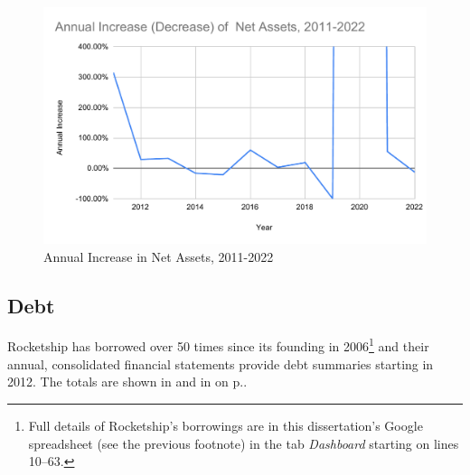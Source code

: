 \begin{figure}[b]
  \centering
  \includegraphics[width=\textwidth,keepaspectratio]{Annual_Increase_Net_Assets_2011-2022}%
  \caption{Annual Increase in Net Assets, 2011-2022}%
  \label{fig:annual_net_asset_increases}
\end{figure}






\subsection{Debt}\indent%
\label{sec:debt}

Rocketship has borrowed over 50 times since its founding in 2006\footnote{Full details of Rocketship's borrowings are in this dissertation's Google spreadsheet (see the previous footnote) in the tab \textit{Dashboard} starting on lines 10–63.} 
and their annual, consolidated financial statements provide debt summaries starting in 2012. The totals are shown in  and in  on p.\pageref{fig:total_debt}.

